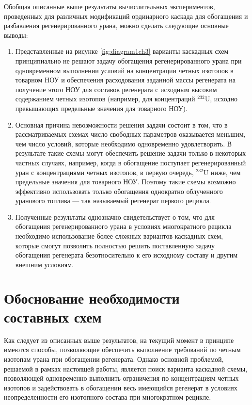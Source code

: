 Обобщая описанные выше результаты вычислительных экспериментов, проведенных для различных модификаций ординарного каскада для обогащения и разбавления регенерированного урана, можно сделать следующие основные выводы:
\begin{enumerate}
  \item Представленные на рисунке \ref{fig:diagram1ch3} варианты каскадных схем принципиально не решают задачу обогащения регенерированного урана при одновременном выполнении условий на концентрации четных изотопов в товарном НОУ и обеспечения расходования заданной массы регенерата на получение этого НОУ для составов регенерата с исходным высоким содержанием четных изотопов (например, для концентраций $^{232}$U, исходно превышающих предельные значения для товарного НОУ). 
  \item Основная причина невозможности решения задачи состоит в том, что в рассматриваемых схемах число свободных параметров оказывается меньшим, чем число условий, которые необходимо одновременно удовлетворить. В результате такие схемы могут обеспечить решение задачи только в некоторых частных случаях, например, когда в обогащение поступает регенерированный уран с концентрациями четных изотопов, в первую очередь, $^{232}$U ниже, чем предельные значения для товарного НОУ. Поэтому такие схемы возможно эффективно использовать только обогащения однократно облученного уранового топлива --- так называемый регенерат первого рецикла. 
  \item Полученные результаты однозначно свидетельствует о том, что для обогащения регенерированного урана в условиях многократного рецикла необходимо использование более сложных вариантов каскадных схем, которые смогут позволить полностью решить поставленную задачу обогащения регенерата безотносительно к его исходному составу и другим внешним условиям.
\end{enumerate}

\section{Обоснование необходимости составных схем}

Как следует из описанных выше результатов, на текущий момент в принципе имеются способы, позволяющие обеспечить выполнение требований по четным изотопам урана при обогащении регенерата. Однако основной проблемой, решаемой в рамках настоящей работы, является поиск варианта каскадной схемы, позволяющей одновременно выполнить ограничения по концентрациям четных изотопов и задействовать в обогащении весь имеющийся регенерат в условиях неопределенности его изотопного состава при многократном рецикле.

